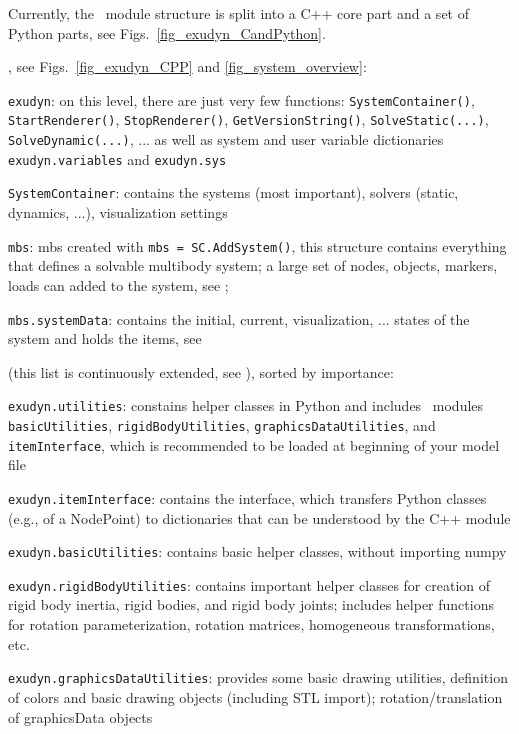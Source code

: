 Currently, the \codeName\ module structure is split into a C++ core part and a set of Python parts,
see Figs.\ \ref{fig_exudyn_CandPython}.
\bi
  \item {}, see Figs.\ \ref{fig_exudyn_CPP} and \ref{fig_system_overview}:
  \bi
    \item[--] \texttt{exudyn}:
    on this level, there are just very few functions: \texttt{SystemContainer()}, \texttt{StartRenderer()}, \texttt{StopRenderer()}, \texttt{GetVersionString()}, \texttt{SolveStatic(...)}, \texttt{SolveDynamic(...)}, ... as well as system and user variable dictionaries \texttt{exudyn.variables} and \texttt{exudyn.sys}
    \item[--] \texttt{SystemContainer}: contains the systems (most important), solvers (static, dynamics, ...), visualization settings
    \item[--] \texttt{mbs}: \acf{mbs} created with \texttt{mbs = SC.AddSystem()}, this structure contains everything that defines a solvable multibody system; a large set of nodes, objects, markers, 
    loads can added to the system, see ;
    \item[--] \texttt{mbs.systemData}: contains the initial, current, visualization, ... states of the system and holds the items, see 
  \ei
  \item {} (this list is continuously extended, see ), sorted by importance:
  \bi
    \item[--] \texttt{exudyn.utilities}: constains helper classes in Python and includes \codeName\ modules \texttt{basicUtilities}, \texttt{rigidBodyUtilities}, \texttt{graphicsDataUtilities}, and \texttt{itemInterface}, which is recommended to be loaded at beginning of your model file
    \item[--] \texttt{exudyn.itemInterface}: contains the interface, which transfers Python classes (e.g., of a NodePoint) to dictionaries that can be understood by the C++ module
    \item[--] \texttt{exudyn.basicUtilities}: contains basic helper classes, without importing numpy
    \item[--] \texttt{exudyn.rigidBodyUtilities}: contains important helper classes for creation of rigid body inertia, rigid bodies, and rigid body joints; includes helper functions for rotation parameterization, rotation matrices, homogeneous transformations, etc.
    \item[--] \texttt{exudyn.graphicsDataUtilities}: provides some basic drawing utilities, definition of colors and basic drawing objects (including \acs{STL} import); rotation/translation of graphicsData objects

